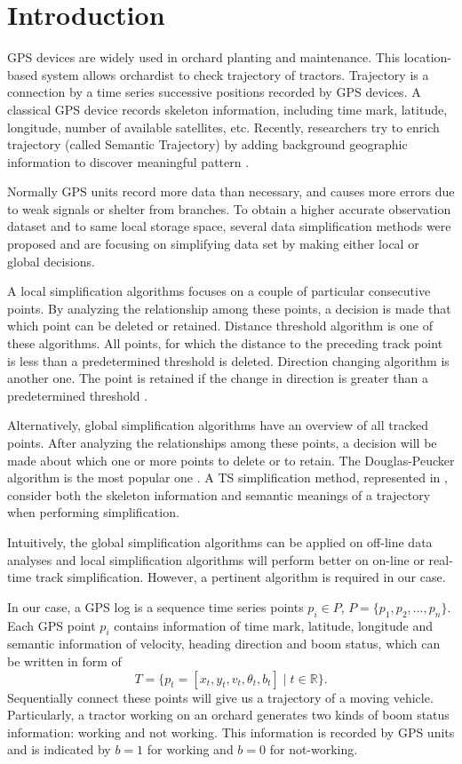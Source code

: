 
\section{Introduction}

GPS devices are widely used in orchard planting and maintenance. This location-based system allows orchardist to check trajectory of tractors. Trajectory is a connection by a time series successive positions recorded by GPS devices. A classical GPS device records skeleton information, including time mark, latitude, longitude, number of available satellites, etc. Recently, researchers try to enrich trajectory (called Semantic Trajectory) by adding background geographic information to discover meaningful pattern \cite{ying2011semantic}. 


Normally GPS units record more data than necessary, and causes more errors due to weak signals or shelter from branches. To obtain a higher accurate observation dataset and to same local storage space, several data simplification methods were proposed and are focusing on simplifying data set by making either local or global decisions. 

A local simplification algorithms focuses on a couple of particular consecutive points. By analyzing the relationship among these points, a decision is made that which point can be deleted or retained. Distance threshold algorithm is one of these algorithms. All points, for which the distance to the preceding track point is less than a predetermined threshold is deleted. Direction changing algorithm is another one. The point is retained if the change in direction is greater than a predetermined threshold  \cite{ivanov2012real}. 

Alternatively, global simplification algorithms have an overview of all tracked points. After analyzing the relationships among these points, a decision will be made about which one or more points to delete or to retain. The Douglas-Peucker algorithm is the most popular one  \cite{douglas1973algorithms}. A TS simplification method, represented in \cite{chen2009trajectory}, consider both the skeleton information and semantic meanings of a trajectory when performing simplification. 


Intuitively, the global simplification algorithms can be applied on off-line data analyses and local simplification algorithms will perform better on on-line or real-time track simplification. However, a pertinent algorithm is required in our case. 


In our case, a GPS log is a sequence time series points $p_i \in P$, $P=\{ p_1,p_2, \ldots, p_n \}$. Each GPS point $p_i$ contains information of time mark, latitude, longitude and semantic information of velocity, heading direction and boom status, which can be written in form of
\begin{equation}
T=\{p_t=[x_t,y_t,v_t,\theta_t,b_t] \mid t \in \mathbb{R} \}.
\end{equation}
Sequentially connect these points will give us a trajectory of a moving vehicle.
Particularly, a tractor working on an orchard generates two kinds of boom status information: working and not working. This information is recorded by GPS units and is indicated by $b=1$ for working and $b=0$ for not-working.


